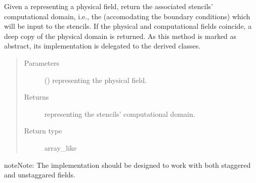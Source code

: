 \documentclass[letterpaper,10pt,english]{sphinxmanual}
\begin{document}
\begin{fulllineitems}

\begin{fulllineitems}
\label{\detokenize{api:dycore.horizontal_boundary.HorizontalBoundary.from_physical_to_computational_domain}}
Given a  representing a physical field, return the associated stencils’ computational
domain, i.e., the  (accomodating the boundary conditions) which will be input
to the stencils. If the physical and computational fields coincide, a deep copy of the physical
domain is returned.
As this method is marked as abstract, its implementation is delegated to the derived classes.
\begin{quote}\begin{description}
\item[{Parameters}] \leavevmode
{} () \textendash{}  representing the physical field.

\item[{Returns}] \leavevmode
{} representing the stencils’ computational domain.

\item[{Return type}] \leavevmode
array\_like

\end{description}\end{quote}

\begin{sphinxadmonition}{note}{Note:}
The implementation should be designed to work with both staggered and unstaggared fields.
\end{sphinxadmonition}

\end{fulllineitems}



\end{fulllineitems}
\end{document}
